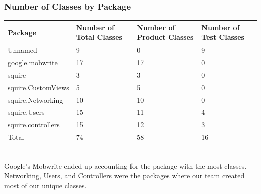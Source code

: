 \documentclass[twoside,letterpaper]{article}
\begin{document}
\subsubsection{ Number of Classes by Package }

\begin{tabular}{|p{4cm}|p{3cm}|p{3cm}|p{3cm}|}
\hline
Package                      & Number of Total Classes & Number of Product Classes & Number of Test Classes \\ \hline
Unnamed                     & 9                       & 0                        & 9                      \\ \hline
google.mobwrite              & 17                      & 17                       & 0                      \\ \hline
squire                       & 3                       & 3                        & 0                      \\ \hline
squire.CustomViews           & 5                       & 5                        & 0                      \\ \hline
squire.Networking            & 10                      & 10                       & 0                      \\ \hline
squire.Users                 & 15                      & 11                       & 4                      \\ \hline
squire.controllers           & 15                      & 12                       & 3                      \\ \hline
Total                       & 74                      & 58                       & 16                     \\ \hline
\end{tabular}
\\ \noindent Google's Mobwrite ended up accounting for the package with the most classes. Networking, Users, and Controllers were the packages where our team created most of our unique classes. 
\end{document}
